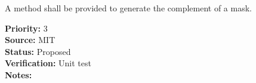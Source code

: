 A method shall be provided to generate the complement of a mask.
\begin{reqlist}
{\bf Priority:} 3 \\
{\bf Source:} MIT \\
{\bf Status:} Proposed \\
{\bf Verification:} Unit test\\
{\bf Notes:} 
\end{reqlist}


